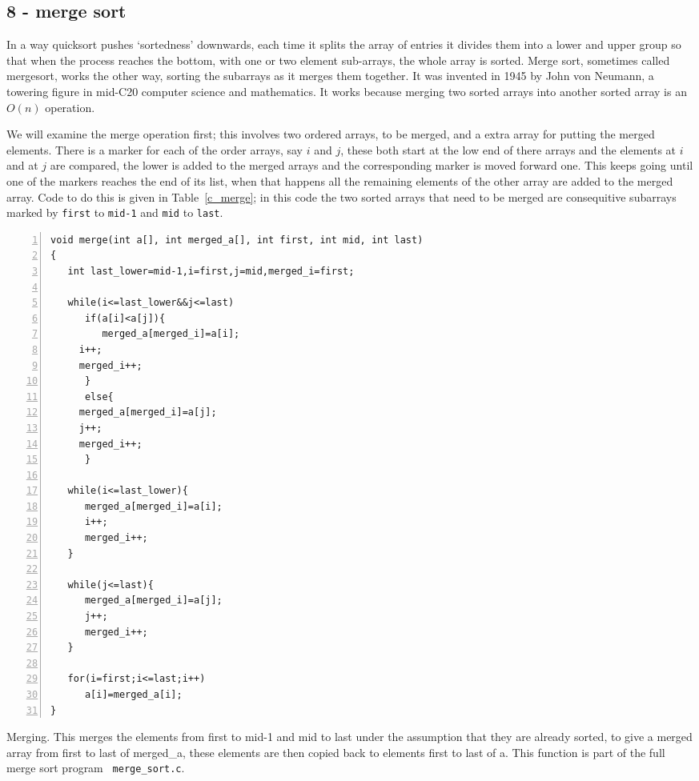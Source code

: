 \documentclass[11pt,a4paper]{scrartcl}
\begin{document}
\subsection*{8 - merge sort}

In a way quicksort pushes \lq{}sortedness\rq{} downwards, each time it
splits the array of entries it divides them into a lower and upper
group so that when the process reaches the bottom, with one or two
element sub-arrays, the whole array is sorted. Merge sort, sometimes
called mergesort, works the other way, sorting the subarrays as it
merges them together. It was invented in 1945 by John von Neumann, a towering
figure in mid-C20 computer science and mathematics. It works because
merging two sorted arrays into another sorted array is an $O(n)$
operation.

We will examine the merge operation first; this involves two ordered
arrays, to be merged, and a extra array for putting the merged
elements. There is a marker for each of the order arrays, say $i$ and
$j$, these both start at the low end of there arrays and the elements
at $i$ and at $j$ are compared, the lower is added to the merged
arrays and the corresponding marker is moved forward one. This keeps
going until one of the markers reaches the end of its list, when that
happens all the remaining elements of the other array are added to the
merged array. Code to do this is given in Table~\ref{c_merge}; in this
code the two sorted arrays that need to be merged are consequitive
subarrays marked by \texttt{first} to \texttt{mid-1} and \texttt{mid} to \texttt{last}.


\begin{table}
\begin{lstlisting}[numbers=left]
void merge(int a[], int merged_a[], int first, int mid, int last)
{
   int last_lower=mid-1,i=first,j=mid,merged_i=first;

   while(i<=last_lower&&j<=last)
      if(a[i]<a[j]){
         merged_a[merged_i]=a[i];
	 i++;
	 merged_i++;
      }
      else{
	 merged_a[merged_i]=a[j];
	 j++;
	 merged_i++;
      }

   while(i<=last_lower){
      merged_a[merged_i]=a[i];
      i++;
      merged_i++;
   }

   while(j<=last){
      merged_a[merged_i]=a[j];
      j++;
      merged_i++;
   }

   for(i=first;i<=last;i++)
      a[i]=merged_a[i];
}
\end{lstlisting}
\caption{Merging. This merges the elements from first to mid-1 and mid
  to last under the assumption that they are already sorted, to give a
  merged array from first to last of merged\_a, these elements are
  then copied back to elements first to last of a. This function is
  part of the full merge sort program {\tt
    merge\_sort.c}. \label{c_merge}}
\end{table}
\end{document}
